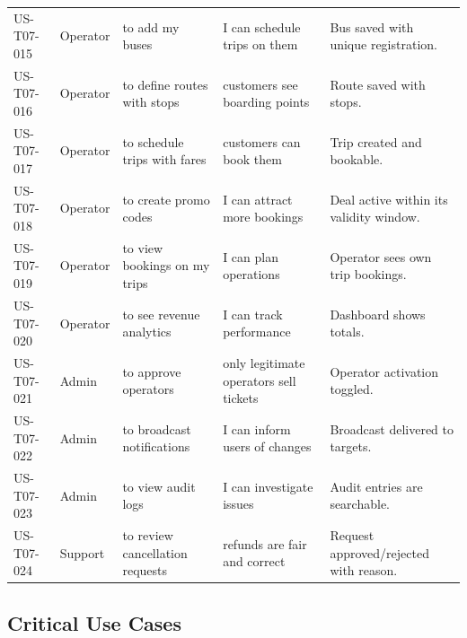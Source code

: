 \documentclass[11pt,a4paper]{article}
\begin{document}
\begin{longtable}{p{2.1cm} p{1.9cm} Y Y Y}
US-T07-015 & Operator & to add my buses & I can schedule trips on them & Bus saved with unique registration. \\
US-T07-016 & Operator & to define routes with stops & customers see boarding points & Route saved with stops. \\
US-T07-017 & Operator & to schedule trips with fares & customers can book them & Trip created and bookable. \\
US-T07-018 & Operator & to create promo codes & I can attract more bookings & Deal active within its validity window. \\
US-T07-019 & Operator & to view bookings on my trips & I can plan operations & Operator sees own trip bookings. \\
US-T07-020 & Operator & to see revenue analytics & I can track performance & Dashboard shows totals. \\
US-T07-021 & Admin & to approve operators & only legitimate operators sell tickets & Operator activation toggled. \\
US-T07-022 & Admin & to broadcast notifications & I can inform users of changes & Broadcast delivered to targets. \\
US-T07-023 & Admin & to view audit logs & I can investigate issues & Audit entries are searchable. \\
US-T07-024 & Support & to review cancellation requests & refunds are fair and correct & Request approved/rejected with reason. \\
\bottomrule
\end{longtable}

\subsection{Critical Use Cases}
\end{document}
